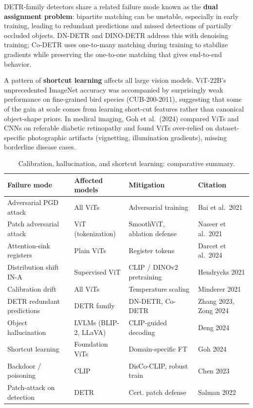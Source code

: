\documentclass{article}
\begin{document}
DETR-family detectors share a related failure mode known as the \textbf{dual assignment problem}: bipartite matching can be unstable, especially in early training, leading to redundant predictions and missed detections of partially occluded objects. DN-DETR and DINO-DETR address this with denoising training; Co-DETR uses one-to-many matching during training to stabilize gradients while preserving the one-to-one matching that gives end-to-end behavior.

A pattern of \textbf{shortcut learning} affects all large vision models. ViT-22B's unprecedented ImageNet accuracy was accompanied by surprisingly weak performance on fine-grained bird species (CUB-200-2011), suggesting that some of the gain at scale comes from learning short-cut features rather than canonical object-shape priors. In medical imaging, Goh et al.~(2024) compared ViTs and CNNs on referable diabetic retinopathy and found ViTs over-relied on dataset-specific photographic artifacts (vignetting, illumination gradients), missing borderline disease cases.

\begin{table}[t]
\centering
\caption{Calibration, hallucination, and shortcut learning: comparative summary.}
\label{tab:calibration-hallucination-and-shortcut-learning}
\begin{tabular}{>{\raggedright\arraybackslash}p{0.2737\linewidth}
  >{\raggedright\arraybackslash}p{0.2211\linewidth}
  >{\raggedright\arraybackslash}p{0.2842\linewidth}
  >{\raggedright\arraybackslash}p{0.2211\linewidth}}
\toprule
Failure mode & Affected models & Mitigation & Citation \\
\midrule
Adversarial PGD attack & All ViTs & Adversarial training & Bai et al.~2021 \\
Patch adversarial attack & ViT (tokenization) & SmoothViT, ablation defense & Naseer et al.~2021 \\
Attention-sink registers & Plain ViTs & Register tokens & Darcet et al.~2024 \\
Distribution shift IN-A & Supervised ViT & CLIP / DINOv2 pretraining & Hendrycks 2021 \\
Calibration drift & All ViTs & Temperature scaling & Minderer 2021 \\
DETR redundant predictions & DETR family & DN-DETR, Co-DETR & Zhang 2023, Zong 2024 \\
Object hallucination & LVLMs (BLIP-2, LLaVA) & CLIP-guided decoding & Deng 2024 \\
Shortcut learning & Foundation ViTs & Domain-specific FT & Goh 2024 \\
Backdoor / poisoning & CLIP & DisCo-CLIP, robust train & Chen 2023 \\
Patch-attack on detection & DETR & Cert. patch defense & Salman 2022 \\
\end{tabular}
\end{table}
\end{document}

